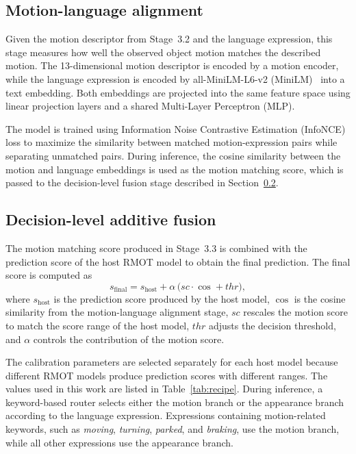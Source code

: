 \documentclass[sigconf,anonymous,nonacm]{acmart}
\begin{document}
\subsection{Motion-language alignment}
\label{sec:align}

Given the motion descriptor from Stage~3.2 and the language expression, this stage measures how well the observed object motion matches the described motion. The 13-dimensional motion descriptor is encoded by a motion encoder, while the language expression is encoded by all-MiniLM-L6-v2 (MiniLM)~\cite{sbert} into a text embedding. Both embeddings are projected into the same feature space using linear projection layers and a shared Multi-Layer Perceptron (MLP).

The model is trained using Information Noise Contrastive Estimation (InfoNCE)~\cite{infonce} loss to maximize the similarity between matched motion-expression pairs while separating unmatched pairs. During inference, the cosine similarity between the motion and language embeddings is used as the motion matching score, which is passed to the decision-level fusion stage described in Section~\ref{sec:fusion}.

\subsection{Decision-level additive fusion}
\label{sec:fusion}

The motion matching score produced in Stage~3.3 is combined with the prediction score of the host RMOT model to obtain the final prediction. The final score is computed as
\begin{equation}
s_{\mathrm{final}} = s_{\mathrm{host}} + \alpha\,\bigl(\mathit{sc}\cdot\cos + \mathit{thr}\bigr),
\label{eq:fusion}
\end{equation}
where $s_{\mathrm{host}}$ is the prediction score produced by the host model, $\cos$ is the cosine similarity from the motion-language alignment stage, $\mathit{sc}$ rescales the motion score to match the score range of the host model, $\mathit{thr}$ adjusts the decision threshold, and $\alpha$ controls the contribution of the motion score.

The calibration parameters are selected separately for each host model because different RMOT models produce prediction scores with different ranges. The values used in this work are listed in Table~\ref{tab:recipe}. During inference, a keyword-based router selects either the motion branch or the appearance branch according to the language expression. Expressions containing motion-related keywords, such as \emph{moving}, \emph{turning}, \emph{parked}, and \emph{braking}, use the motion branch, while all other expressions use the appearance branch.
\end{document}

